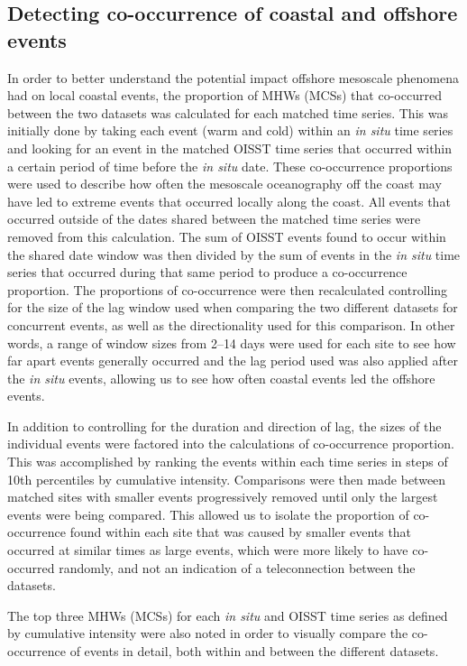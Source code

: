 \documentclass[a4paper,10pt,review]{elsarticle}
\begin{document}
\subsection{Detecting co-occurrence of coastal and offshore events}
In order to better understand the potential impact offshore mesoscale phenomena had on local coastal events, the proportion of MHWs (MCSs) that co-occurred between the two datasets was calculated for each matched time series. This was initially done by taking each event (warm and cold) within an \emph{in situ} time series and looking for an event in the matched OISST time series that occurred within a certain period of time before the \emph{in situ} date. These co-occurrence proportions were used to describe how often the mesoscale oceanography off the coast may have led to extreme events that occurred locally along the coast. All events that occurred outside of the dates shared between the matched time series were removed from this calculation. The sum of OISST events found to occur within the shared date window was then divided by the sum of events in the \emph{in situ} time series that occurred during that same period to produce a co-occurrence proportion. The proportions of co-occurrence were then recalculated controlling for the size of the lag window used when comparing the two different datasets for concurrent events, as well as the directionality used for this comparison. In other words, a range of window sizes from 2--14 days were used for each site to see how far apart events generally occurred and the lag period used was also applied after the \emph{in situ} events, allowing us to see how often coastal events led the offshore events.

In addition to controlling for the duration and direction of lag, the sizes of the individual events were factored into the calculations of co-occurrence proportion. This was accomplished by ranking the events within each time series in steps of 10th percentiles by cumulative intensity. Comparisons were then made between matched sites with smaller events progressively removed until only the largest events were being compared. This allowed us to isolate the proportion of co-occurrence found within each site that was caused by smaller events that occurred at similar times as large events, which were more likely to have co-occurred randomly, and not an indication of a teleconnection between the datasets.

The top three MHWs (MCSs) for each \emph{in situ} and OISST time series as defined by cumulative intensity were also noted in order to visually compare the co-occurrence of events in detail, both within and between the different datasets.
\end{document}
